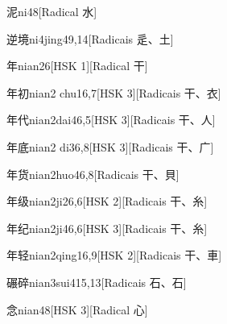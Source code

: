 \begin{entry}{泥}{ni4}{8}[Radical ⽔]
\end{entry}

\begin{entry}{逆境}{ni4jing4}{9,14}[Radicais ⾡、⼟]
\end{entry}

\begin{entry}{年}{nian2}{6}[HSK 1][Radical ⼲]
\end{entry}

\begin{entry}{年初}{nian2 chu1}{6,7}[HSK 3][Radicais ⼲、⾐]
\end{entry}

\begin{entry}{年代}{nian2dai4}{6,5}[HSK 3][Radicais ⼲、⼈]
\end{entry}

\begin{entry}{年底}{nian2 di3}{6,8}[HSK 3][Radicais ⼲、⼴]
\end{entry}

\begin{entry}{年货}{nian2huo4}{6,8}[Radicais ⼲、⾙]
\end{entry}

\begin{entry}{年级}{nian2ji2}{6,6}[HSK 2][Radicais ⼲、⽷]
\end{entry}

\begin{entry}{年纪}{nian2ji4}{6,6}[HSK 3][Radicais ⼲、⽷]
\end{entry}

\begin{entry}{年轻}{nian2qing1}{6,9}[HSK 2][Radicais ⼲、⾞]
\end{entry}

\begin{entry}{碾碎}{nian3sui4}{15,13}[Radicais ⽯、⽯]
\end{entry}

\begin{entry}{念}{nian4}{8}[HSK 3][Radical ⼼]
\end{entry}

